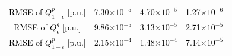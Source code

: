 \documentclass[journal]{IEEEtran}
\theoremstyle{definition}
\theoremstyle{remark}
\begin{document}
\begin{table}[t!]
\begin{threeparttable}
\begin{tabular}{cccc}
\multicolumn{1}{c|}{\textcolor{black}{RMSE of $Q_{1-\epsilon}^{p}$ [p.u.]}} & \textcolor{black}{7.30$\times 10^{-5}$} & \textcolor{black}{4.70$\times 10^{-5}$} &  \textcolor{black}{1.27$\times 10^{-6}$}                          \\ 
\multicolumn{1}{c|}{\textcolor{black}{RMSE of $Q_{\epsilon}^{q}$ [p.u.]}} & \textcolor{black}{9.86$\times 10^{-5}$} & \textcolor{black}{3.13$\times 10^{-5}$} &  \textcolor{black}{2.71$\times 10^{-5}$}                          \\ 
\multicolumn{1}{c|}{\textcolor{black}{RMSE of $Q_{1-\epsilon}^{p}$ [p.u.]}} & \textcolor{black}{2.15$\times 10^{-4}$} & \textcolor{black}{1.48$\times 10^{-4}$} &  \textcolor{black}{7.14$\times 10^{-5}$}                          \\ 
\midrule
\end{tabular}
\end{threeparttable}
\vspace{-15pt}
\end{table}
\end{document}
